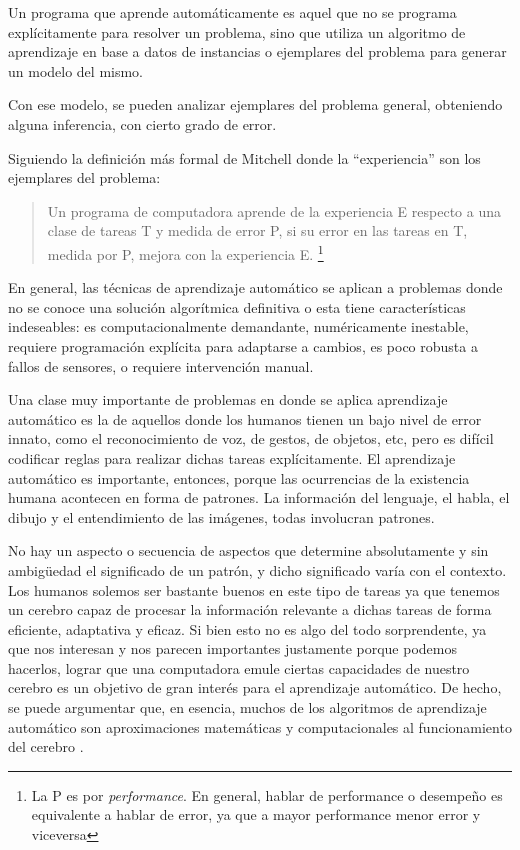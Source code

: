 
Un programa que aprende automáticamente es aquel que no se programa explícitamente para resolver un problema, sino que utiliza un algoritmo de aprendizaje en base a datos de instancias o ejemplares del problema para generar un modelo del mismo.


Con ese modelo, se pueden analizar ejemplares del problema general, obteniendo alguna inferencia, con cierto grado de error. 


Siguiendo la definición más formal de Mitchell \cite{mitchell1997} donde la ``experiencia'' son los ejemplares del problema:

\begin{quote} Un programa de computadora aprende de la experiencia E respecto a una clase de tareas T y medida de error P, si su error en las tareas en T, medida por P, mejora con la experiencia E. \footnote{La P es por \textit{performance}. En general, hablar de performance o desempeño es equivalente a hablar de error, ya que a mayor performance menor error y viceversa} \end{quote}

En general, las técnicas de aprendizaje automático se aplican a problemas donde no se conoce una solución algorítmica definitiva o esta tiene características indeseables: es computacionalmente demandante, numéricamente inestable, requiere programación explícita para adaptarse a cambios, es poco robusta a fallos de sensores, o requiere intervención manual. 

Una clase muy importante de problemas en donde se aplica aprendizaje automático es la de aquellos donde los humanos tienen un bajo nivel de error innato, como el reconocimiento de voz, de gestos, de objetos, etc, pero es difícil codificar reglas para realizar dichas tareas explícitamente. El aprendizaje automático es importante, entonces, porque las ocurrencias de la existencia humana acontecen en forma de patrones. La información del lenguaje, el habla, el dibujo y el entendimiento de las imágenes, todas involucran patrones.

No hay un aspecto o secuencia de aspectos que determine absolutamente y sin ambigüedad el significado de un patrón, y dicho significado varía con el contexto. Los humanos solemos ser bastante buenos en este tipo de tareas ya que tenemos un cerebro capaz de procesar la información relevante a dichas tareas de forma eficiente, adaptativa y eficaz. Si bien esto no es algo del todo sorprendente, ya que nos interesan y nos parecen importantes justamente porque podemos hacerlos, lograr que una computadora emule ciertas capacidades de nuestro cerebro es un objetivo de gran interés para el aprendizaje automático. De hecho, se puede argumentar que, en esencia, muchos de los algoritmos de aprendizaje automático son aproximaciones matemáticas y computacionales al funcionamiento del cerebro \cite{shannon1953,meltzoff2009,lioutikov2012}.

